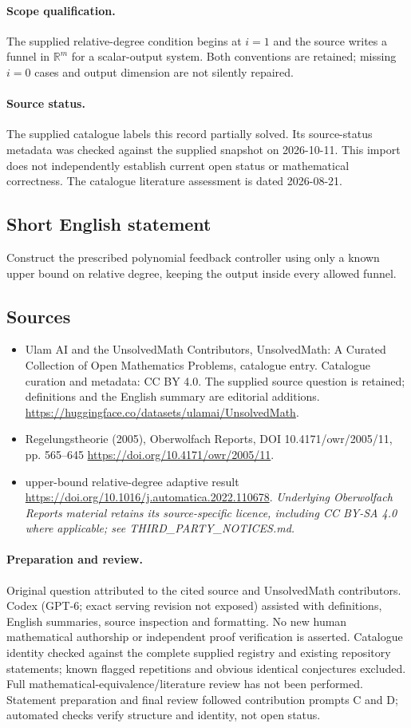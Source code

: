 \documentclass[11pt]{article}
\begin{document}
\paragraph{Scope qualification.}
The supplied relative-degree condition begins at $i=1$ and the source writes a funnel in $\mathbb R^m$ for a scalar-output system. Both conventions are retained; missing $i=0$ cases and output dimension are not silently repaired.
\paragraph{Source status.}
The supplied catalogue labels this record partially solved. Its source-status metadata was checked against the supplied snapshot on 2026-10-11. This import does not independently establish current open status or mathematical correctness. The catalogue literature assessment is dated 2026-08-21.
\subsection{Short English statement}
Construct the prescribed polynomial feedback controller using only a known upper bound on relative degree, keeping the output inside every allowed funnel.
\subsection{Sources}
\begin{itemize}
\item[S1] Ulam AI and the UnsolvedMath Contributors, UnsolvedMath: A Curated Collection of Open Mathematics Problems, catalogue entry. Catalogue curation and metadata: CC BY 4.0. The supplied source question is retained; definitions and the English summary are editorial additions.
\url{https://huggingface.co/datasets/ulamai/UnsolvedMath}.
\item[S2] Regelungstheorie (2005), Oberwolfach Reports, DOI 10.4171/owr/2005/11, pp. 565--645
\url{https://doi.org/10.4171/owr/2005/11}.
\item[S3] upper-bound relative-degree adaptive result
\url{https://doi.org/10.1016/j.automatica.2022.110678}.
\textit{Underlying Oberwolfach Reports material retains its source-specific licence, including CC BY-SA 4.0 where applicable; see THIRD\_PARTY\_NOTICES.md.}
\end{itemize}
\paragraph{Preparation and review.}
Original question attributed to the cited source and UnsolvedMath contributors. Codex (GPT-6; exact serving revision not exposed) assisted with definitions, English summaries, source inspection and formatting. No new human mathematical authorship or independent proof verification is asserted. Catalogue identity checked against the complete supplied registry and existing repository statements; known flagged repetitions and obvious identical conjectures excluded. Full mathematical-equivalence/literature review has not been performed. Statement preparation and final review followed contribution prompts C and D; automated checks verify structure and identity, not open status.
\label{end:statement}
\end{document}
